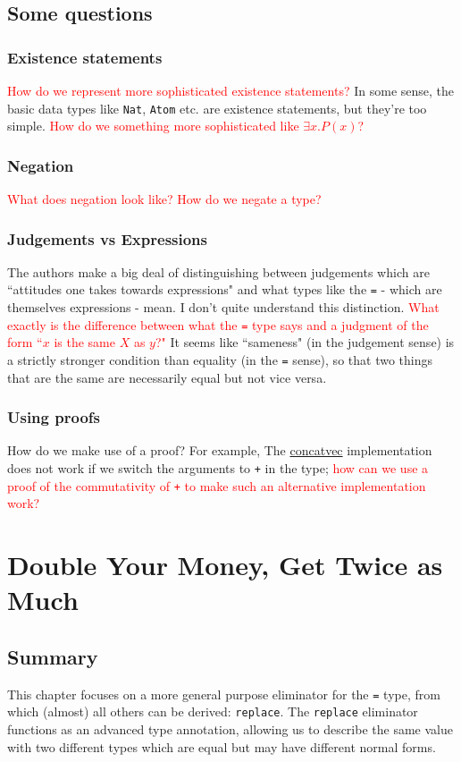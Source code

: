 \documentclass{article}
\newcommand{\ttt}[1]{\texttt{#1}}
\begin{document}
\subsection{Some questions}
\subsubsection*{Existence statements}
\textcolor{red}{How do we represent more sophisticated existence statements?} In some sense, the basic data types like \ttt{Nat}, \ttt{Atom} etc. are existence statements, but they're too simple. \textcolor{red}{How do we something more sophisticated like \(\exists x. P(x)\)?} 
\subsubsection*{Negation}
\textcolor{red}{What does negation look like? How do we negate a type?}
\subsubsection*{Judgements vs Expressions}
The authors make a big deal of distinguishing between judgements which are ``attitudes one takes towards expressions" and what types like the \ttt{=} - which are themselves expressions - mean. I don't quite understand this distinction. \textcolor{red}{What exactly is the difference between what the \ttt{=} type says and a judgment of the form ``\(x\) is the same \(X\) as \(y\)?"} It seems like ``sameness" (in the judgement sense) is a strictly stronger condition than equality (in the \ttt{=} sense), so that two things that are the same are necessarily equal but not vice versa.
\subsubsection*{Using proofs}
How do we make use of a proof? For example, The \hyperref[code:concatvec]{concatvec} implementation does not work if we switch the arguments to \ttt{+} in the type; \textcolor{red}{how can we use a proof of the commutativity of \ttt{+} to make such an alternative implementation work?}
\section{Double Your Money, Get Twice as Much}
\subsection{Summary}
This chapter focuses on a more general purpose eliminator for the \ttt{=} type, from which (almost) all others can be derived: \ttt{replace}. The \ttt{replace} eliminator functions as an advanced type annotation, allowing us to describe the same value with two different types which are equal but may have different normal forms.
\end{document}
